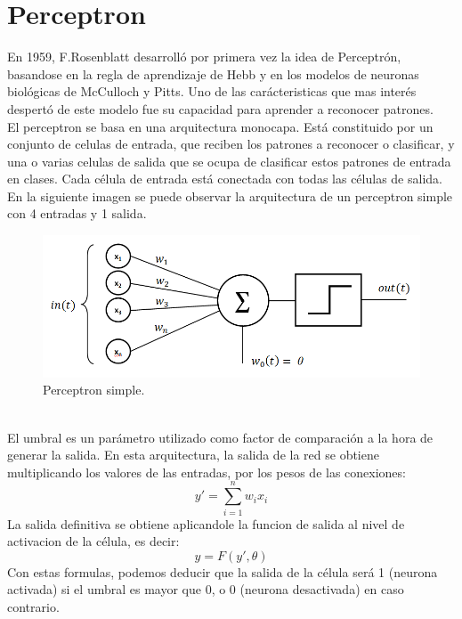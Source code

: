 \section {Perceptron}
En 1959, F.Rosenblatt desarrolló por primera vez la idea de Perceptrón, basandose en la regla de aprendizaje de Hebb y en los modelos de neuronas biológicas de McCulloch y Pitts. Uno de las carácteristicas que mas interés despertó de este modelo fue su capacidad para aprender a reconocer patrones.\\
El perceptron se basa en una arquitectura monocapa. Está constituido por un conjunto de celulas de entrada, que reciben los patrones a reconocer o clasificar, y una o varias celulas de salida que se ocupa de clasificar estos patrones de entrada en clases. Cada célula de entrada está conectada con todas las células de salida. En la siguiente imagen se puede observar la arquitectura de un perceptron simple con 4 entradas y 1 salida.
\begin{figure}[htp]
\centering
\vspace{-1em}
\includegraphics[scale=0.5]{images/perceptron.png}
\caption{Perceptron simple.}
\end{figure}
\\El umbral es un parámetro utilizado como factor de comparación a la hora de generar la salida. En esta arquitectura, la salida de la red se obtiene multiplicando los valores de las entradas, por los pesos de las conexiones:
\begin{equation}\label{Umbral perceptron}
y' =  \sum_{i=1}^{n} w_{i}x_{i}
\end{equation}
La salida definitiva se obtiene aplicandole la funcion de salida al nivel de activacion de la célula, es decir:
\begin{equation}\label{Salida perceptron}
y =  F(y', \theta)
\end{equation}
Con estas formulas, podemos deducir que la salida de la célula será 1 (neurona activada) si el umbral es mayor que 0, o 0 (neurona desactivada) en caso contrario.\\
